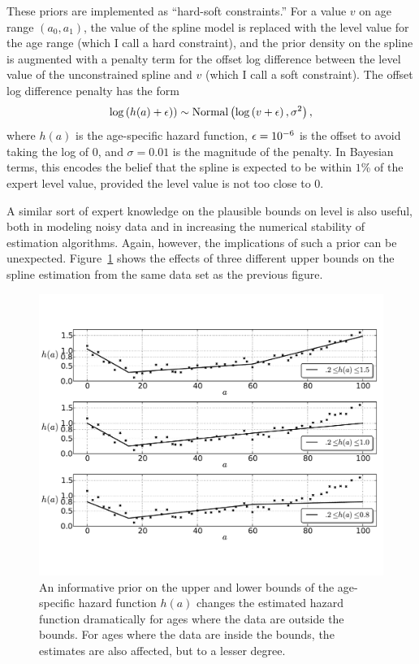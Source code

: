 These priors are implemented as ``hard-soft constraints.''  For a
value $v$ on age range $(a_0,a_1)$, the value of the spline model is
replaced with the level value for the age range (which I call a hard
constraint), and the prior density on the spline is augmented with a
penalty term for the offset log difference between the level value of
the unconstrained spline and $v$ (which I call a soft constraint). The
offset log difference penalty has the form
\[
\log\left(h(a)+\epsilon)\right) \sim
 \operatorname{Normal}\left(\log\left(v + \epsilon\right), \sigma^2\right),
\]
where $h(a)$ is the age-specific hazard function, $\epsilon = 10^{-6}$ is the
offset to avoid taking the log of $0$, and $\sigma = 0.01$ is the
magnitude of the penalty.  In Bayesian terms, this encodes the belief
that the spline is expected to be within $1$\% of the expert level
value, provided the level value is not too close to $0$.

A similar sort of expert knowledge on the plausible bounds on
level is also useful, both in modeling noisy data and in increasing
the numerical stability of estimation algorithms. Again, however, the
implications of such a prior can be unexpected.
Figure~\ref{level-bounds-priors} shows the effects of three different
upper bounds on the spline estimation from the same data set as the
previous figure.

\begin{figure}[h]
\begin{center}
\includegraphics[width=\textwidth]{level_bound-smoothing-splines.pdf}
\caption[An informative prior on the upper and lower bounds of the
  age-specific hazard function $h(a)$.]{An informative prior on the
  upper and lower bounds of the age-specific hazard function $h(a)$
  changes the estimated hazard function dramatically for
  ages where the data are outside the bounds. For ages where the data
  are inside the bounds, the estimates are also affected, but to a lesser degree.}
\label{level-bounds-priors}
\end{center}
\end{figure}



